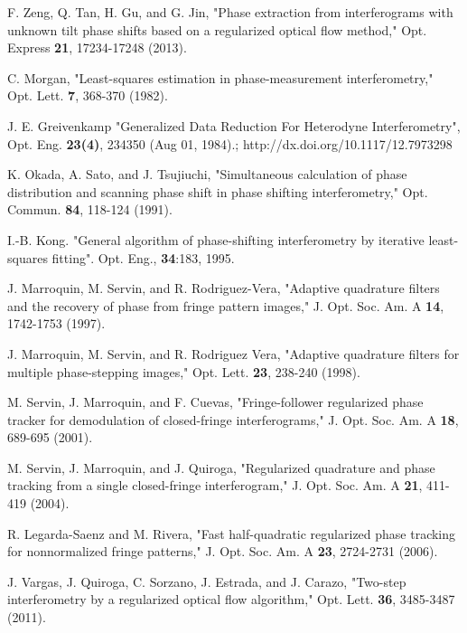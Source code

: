 \begin{thebibliography}{99}
   F. Zeng, Q. Tan, H. Gu, and G. Jin, "Phase extraction from 
  interferograms with unknown tilt phase shifts based on a regularized optical
  flow method," Opt. Express \textbf{21}, 17234-17248 (2013).
 

   C. Morgan, "Least-squares estimation in phase-measurement 
  interferometry," Opt.  Lett. \textbf{7}, 368-370 (1982).
  
   J. E. Greivenkamp "Generalized Data Reduction For 
  Heterodyne Interferometry", Opt. Eng. \textbf{23(4)}, 234350 (Aug 01, 1984).; 
  http://dx.doi.org/10.1117/12.7973298

   K. Okada, A. Sato, and J. Tsujiuchi, "Simultaneous 
  calculation of phase distribution and scanning phase shift in phase 
  shifting interferometry," Opt.  Commun. \textbf{84}, 118-124 (1991).
  
   I.-B. Kong. "General algorithm of phase-shifting 
  interferometry by iterative least-squares fitting". Opt. Eng., 
  \textbf{34}:183, 1995.
 

  
   J. Marroquin, M. Servin, and R. Rodriguez-Vera,
  "Adaptive quadrature filters and the recovery of phase from fringe
  pattern images," J. Opt. Soc. Am. A \textbf{14}, 1742-1753 (1997).
  
   J. Marroquin, M. Servin, and R. Rodriguez Vera, 
  "Adaptive quadrature filters for multiple phase-stepping images," Opt. 
  Lett.  \textbf{23}, 238-240 (1998).

   M. Servin, J. Marroquin, and F. Cuevas, "Fringe-follower 
  regularized phase tracker for demodulation of closed-fringe interferograms," 
  J. Opt. Soc. Am. A \textbf{18}, 689-695 (2001).
  
   M. Servin, J. Marroquin, and J. Quiroga, "Regularized
  quadrature and phase tracking from a single closed-fringe interferogram," J. 
  Opt. Soc. Am. A \textbf{21}, 411-419 (2004).
  
   R. Legarda-Saenz and M. Rivera, "Fast half-quadratic 
  regularized phase tracking for nonnormalized fringe patterns," J. Opt. Soc. 
  Am. A \textbf{23}, 2724-2731 (2006).
  
   J. Vargas, J. Quiroga, C. Sorzano, J. Estrada, and J. Carazo,
  "Two-step interferometry by a regularized optical flow algorithm," Opt. Lett. 
  \textbf{36}, 3485-3487 (2011).
  
  
  
\end{thebibliography}

%
